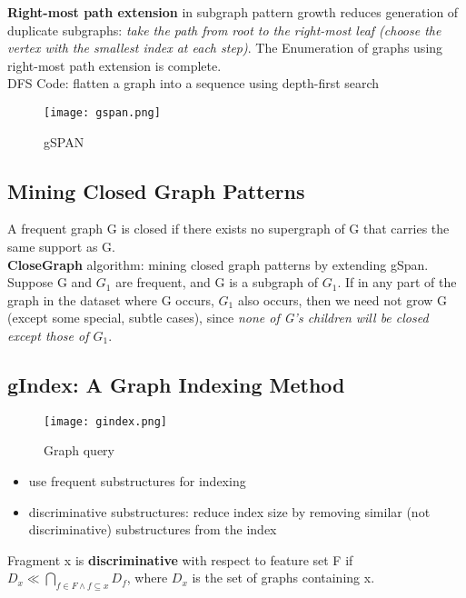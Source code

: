 \textbf{Right-most path extension} in subgraph pattern growth reduces generation of duplicate subgraphs: \textit{take the path from root to the right-most leaf (choose the vertex with the smallest index at each step)}. The Enumeration of graphs using right-most path extension is complete.\\

DFS Code: flatten a graph into a sequence using depth-first search

\begin{figure}[H]
    \centering
    \texttt{[image: gspan.png]}
    \caption{gSPAN}
\end{figure}

\subsection{Mining Closed Graph Patterns}

A frequent graph G is closed if there exists no supergraph of G that carries the same support as G.\\

\textbf{CloseGraph} algorithm: mining closed graph patterns by extending gSpan. Suppose G and $G_1$ are frequent, and G is a subgraph of $G_1$. If in any part of the graph in the dataset where G occurs, $G_1$ also occurs, then we need not grow G (except some special, subtle cases), since \textit{none of G’s children will be closed except those of $G_1$}.

\subsection{gIndex: A Graph Indexing Method}

\begin{figure}[H]
    \centering
    \texttt{[image: gindex.png]}
    \caption{Graph query}
\end{figure}

\begin{itemize}
\item use frequent substructures for indexing
\item discriminative substructures: reduce index size by removing similar (not discriminative) substructures from the index
\end{itemize}

\begin{definition}
Fragment x is \textbf{discriminative} with respect to feature set F if $D_x \ll \bigcap_{f \in F \wedge f \subseteq x}D_f$, where $D_x$ is the set of graphs containing x.
\end{definition}

